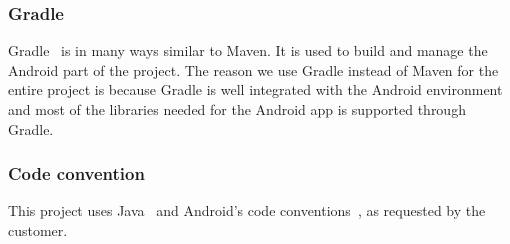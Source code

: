 \subsubsection{Gradle}
Gradle~\cite{gradle} is in many ways similar to Maven. It is used to build and manage the Android part of the project. The reason we use Gradle instead of Maven for the entire project is because Gradle is well integrated with the Android environment and most of the libraries needed for the Android app is supported through Gradle.

\subsubsection{Code convention}
This project uses Java~\cite{javaconv} and Android's code conventions~\cite{androidconv}, as requested by the customer.
